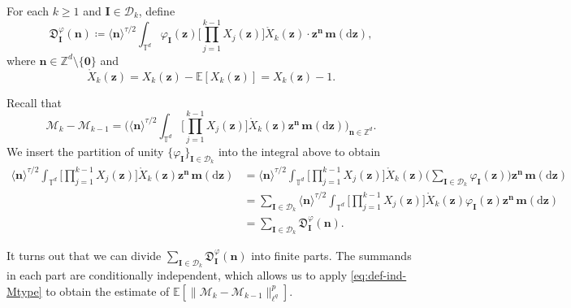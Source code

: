 \documentclass[12pt]{amsart}
\theoremstyle{definition}
\theoremstyle{remark}
\newcommand{\bz}{\boldsymbol{z}}
\newcommand{\Z}{\mathbb{Z}}
\newcommand{\E}{\mathbb{E}}
\newcommand{\T}{\mathbb{T}}
\numberwithin{equation}{section}
\begin{document}
For each $k\ge 1$ and $\boldsymbol{I}\in \mathscr{D}_k$, define
\[
\mathfrak{D}_{\boldsymbol{I}}^\varphi(\boldsymbol{n})\coloneq \langle \boldsymbol{n}\rangle^{\tau/2}\int_{\T^d}\varphi_{\boldsymbol{I}}(\bz)\bigg[\prod_{j=1}^{k-1}X_j(\bz)\bigg]\mathring{X}_k(\bz)\cdot \bz^{\boldsymbol{n}}\,\boldsymbol{m}(\mathrm{d}\bz),
\]
where $\boldsymbol{n}\in \Z^d\setminus\{\boldsymbol{0}\}$ and 
\[
\mathring{X}_k(\bz)=X_k(\bz)-\E[X_k(\bz)]=X_k(\bz)-1.
\]

Recall that 
\[
\mathcal{M}_k-\mathcal{M}_{k-1}=\bigg(\langle \boldsymbol{n}\rangle^{\tau/2}\int_{\T^d}\bigg[\prod_{j=1}^{k-1}X_j(\bz)\bigg]\mathring{X}_k(\bz)\bz^{\boldsymbol{n}}\,\boldsymbol{m}(\mathrm{d}\bz)\bigg)_{\boldsymbol{n}\in \Z^d}.
\]
We insert the partition of unity $\{\varphi_{\boldsymbol{I}}\}_{\boldsymbol{I}\in \mathscr{D}_k}$ into the integral above to obtain
\begin{align*}
\langle \boldsymbol{n}\rangle^{\tau/2}\int_{\T^d}\bigg[\prod_{j=1}^{k-1}X_j(\bz)\bigg]\mathring{X}_k(\bz)\bz^{\boldsymbol{n}}\,\boldsymbol{m}(\mathrm{d}\bz)&=\langle \boldsymbol{n}\rangle^{\tau/2}\int_{\T^d}\bigg[\prod_{j=1}^{k-1}X_j(\bz)\bigg]\mathring{X}_k(\bz)\Big(\sum_{\boldsymbol{I}\in \mathscr{D}_k}\varphi_{\boldsymbol{I}}(\bz)\Big)\bz^{\boldsymbol{n}}\,\boldsymbol{m}(\mathrm{d}\bz)\\
&=\sum_{\boldsymbol{I}\in \mathscr{D}_k}\langle \boldsymbol{n}\rangle^{\tau/2}\int_{\T^d}\bigg[\prod_{j=1}^{k-1}X_j(\bz)\bigg]\mathring{X}_k(\bz)\varphi_{\boldsymbol{I}}(\bz)\bz^{\boldsymbol{n}}\,\boldsymbol{m}(\mathrm{d}\bz)\\
&=\sum_{\boldsymbol{I}\in \mathscr{D}_k}\mathfrak{D}_{\boldsymbol{I}}^\varphi(\boldsymbol{n}).
\end{align*}

It turns out that we can divide $\sum_{\boldsymbol{I}\in \mathscr{D}_k}\mathfrak{D}_{\boldsymbol{I}}^\varphi(\boldsymbol{n})$ into finite parts. The summands in each part are conditionally independent, which allows us to apply \eqref{eq:def-ind-Mtype} to obtain the estimate of $\E[\|\mathcal{M}_k-\mathcal{M}_{k-1}\|_{\ell^q}^p]$.
\end{document}
